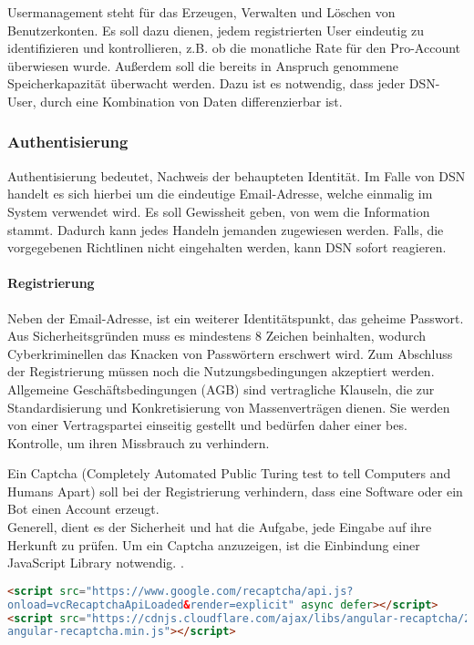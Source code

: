 
Usermanagement steht für das Erzeugen, Verwalten und Löschen von Benutzerkonten. Es soll dazu dienen, jedem registrierten User eindeutig zu identifizieren und kontrollieren, z.B. ob die monatliche Rate für den Pro-Account überwiesen wurde. Außerdem soll die bereits in Anspruch genommene Speicherkapazität überwacht werden. Dazu ist es notwendig, dass jeder DSN-User, durch eine Kombination von Daten differenzierbar ist.
\subsubsection{Authentisierung}
Authentisierung bedeutet, Nachweis der behaupteten Identität. Im Falle von DSN handelt es sich hierbei um die eindeutige Email-Adresse, welche einmalig im System verwendet wird. Es soll Gewissheit geben, von wem die Information stammt. Dadurch kann jedes Handeln jemanden zugewiesen werden. Falls, die vorgegebenen Richtlinen nicht eingehalten werden, kann DSN sofort reagieren.
\paragraph{Registrierung}
Neben der Email-Adresse, ist ein weiterer Identitätspunkt, das geheime Passwort. Aus Sicherheitsgründen muss es mindestens 8 Zeichen beinhalten, wodurch Cyberkriminellen das Knacken von Passwörtern erschwert wird. Zum Abschluss der Registrierung müssen noch die Nutzungsbedingungen akzeptiert werden.\\
\grqq{}Allgemeine Geschäftsbedingungen (AGB) sind vertragliche Klauseln, die zur Standardisierung und Konkretisierung von Massenverträgen dienen. Sie werden von einer Vertragspartei einseitig gestellt und bedürfen daher einer bes. Kontrolle, um ihren Missbrauch zu verhindern.\grqq{}\cite{AGB}\\
\cite{VERTEILTE_SYSTEME}\cite{PASSWORT_SCHUTZ}


\newpage

Ein Captcha (Completely Automated Public Turing test to tell Computers and Humans Apart) soll bei der Registrierung verhindern, dass eine Software oder ein Bot einen Account erzeugt.\\
Generell, dient es der Sicherheit und hat die Aufgabe, jede Eingabe auf ihre Herkunft zu prüfen. Um ein Captcha anzuzeigen, ist die Einbindung einer JavaScript Library notwendig. \cite{CAPTCHA}.
\begin{lstlisting}[caption={Einbindung der JS-Library Recaptcha}, language=HTML]
<script src="https://www.google.com/recaptcha/api.js?
onload=vcRecaptchaApiLoaded&render=explicit" async defer></script>
<script src="https://cdnjs.cloudflare.com/ajax/libs/angular-recaptcha/2.2.5/
angular-recaptcha.min.js"></script>
\end{lstlisting}


